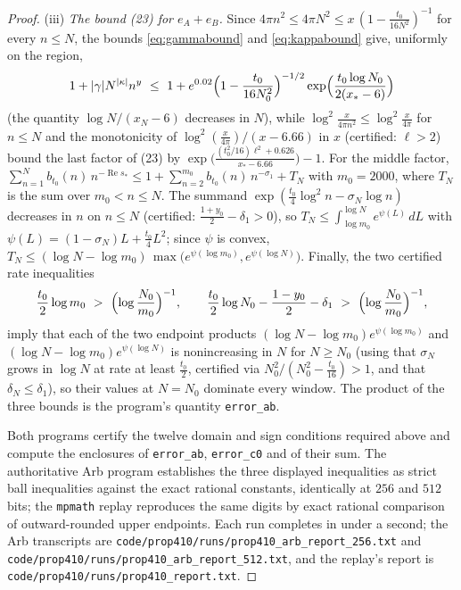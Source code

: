 \documentclass[11pt]{article}
\theoremstyle{definition}
\DeclareMathOperator{\Rea}{Re}
\begin{document}
\begin{proof}
(iii) \emph{The bound (23) for $e_A+e_B$.} Since
$4\pi n^2\le4\pi N^2\le x\,(1-\frac{t_0}{16N^2})^{-1}$ for every
$n\le N$, the bounds \eqref{eq:gammabound} and \eqref{eq:kappabound}
give, uniformly on the region,
\[
1+|\gamma|N^{|\kappa|}n^y\ \le\
1+e^{0.02}\Bigl(1-\frac{t_0}{16N_0^2}\Bigr)^{-1/2}
\exp\Bigl(\frac{t_0\log N_0}{2(x_*-6)}\Bigr)
\]
(the quantity $\log N/(x_N-6)$ decreases in $N$), while
$\log^2\frac{x}{4\pi n^2}\le\log^2\frac x{4\pi}$ for $n\le N$ and
the monotonicity of $\log^2(\frac x{4\pi})/(x-6.66)$ in $x$
(certified: $\ell>2$) bound the last factor of (23) by
$\exp\bigl(\frac{(t_0^2/16)\ell^2+0.626}{x_*-6.66}\bigr)-1$. For
the middle factor, $\sum_{n=1}^{N}b_{t_0}(n)\,n^{-\Rea s_*}\le
1+\sum_{n=2}^{m_0}b_{t_0}(n)\,n^{-\sigma_1}+T_N$ with $m_0=2000$,
where $T_N$ is the sum over $m_0<n\le N$. The summand
$\exp(\frac{t_0}4\log^2n-\sigma_N\log n)$ decreases in $n$ on
$n\le N$ (certified: $\frac{1+y_0}2-\delta_1>0$), so
$T_N\le\int_{\log m_0}^{\log N}e^{\psi(L)}\,dL$ with
$\psi(L)=(1-\sigma_N)L+\frac{t_0}4L^2$; since $\psi$ is convex,
$T_N\le(\log N-\log m_0)\,
\max\bigl(e^{\psi(\log m_0)},e^{\psi(\log N)}\bigr)$. Finally, the
two certified rate inequalities
\[
\frac{t_0}2\log m_0\ >\ \Bigl(\log\frac{N_0}{m_0}\Bigr)^{-1},
\qquad
\frac{t_0}2\log N_0-\frac{1-y_0}2-\delta_1\ >\
\Bigl(\log\frac{N_0}{m_0}\Bigr)^{-1},
\]
imply that each of the two endpoint products
$(\log N-\log m_0)e^{\psi(\log m_0)}$ and
$(\log N-\log m_0)e^{\psi(\log N)}$ is nonincreasing in $N$ for
$N\ge N_0$ (using that $\sigma_N$ grows in $\log N$ at rate at
least $\frac{t_0}2$, certified via $N_0^2/(N_0^2-\frac{t_0}{16})>1$,
and that $\delta_N\le\delta_1$), so their values at $N=N_0$
dominate every window. The product of the three bounds is the
program's quantity \texttt{error\_ab}.

Both programs certify the twelve domain and sign conditions
required above and compute the enclosures of
\texttt{error\_ab}, \texttt{error\_c0} and of their sum.  The
authoritative Arb program establishes the three displayed
inequalities as strict ball inequalities against the exact
rational constants, identically at $256$ and $512$ bits; the
\texttt{mpmath} replay reproduces the same digits by exact
rational comparison of outward-rounded upper endpoints.  Each run
completes in under a second; the Arb transcripts are
\texttt{code/prop410/runs/prop410\_arb\_report\_256.txt} and
\texttt{code/prop410/runs/prop410\_arb\_report\_512.txt}, and the
replay's report is
\texttt{code/prop410/runs/prop410\_report.txt}.
\end{proof}
\end{document}
